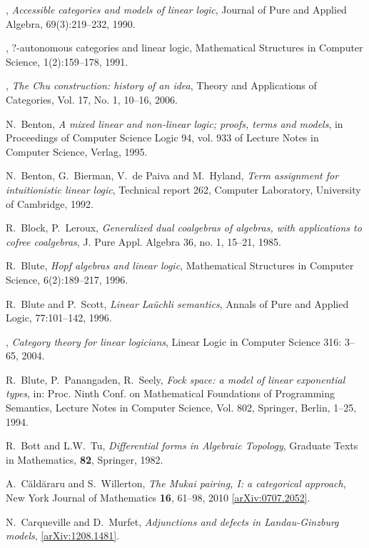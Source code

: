 \documentclass[english,letter paper,12pt,reqno]{article}
\theoremstyle{example}
\numberwithin{equation}{section}
\begin{document}
\begin{thebibliography}{BHLS03}
\bysame, \textsl{Accessible categories and models of linear logic}, Journal of Pure and Applied Algebra, 69(3):219--232, 1990.

\bysame, {$?$-autonomous categories and linear logic}, Mathematical Structures in Computer Science, 1(2):159--178, 1991.

\bysame, \textsl{The {C}hu construction: history of an idea}, Theory and Applications of Categories, Vol. 17, No. 1, 10--16, 2006.

N.~Benton, \textsl{A mixed linear and non-linear logic; proofs, terms and models}, in Proceedings of Computer Science Logic 94, vol. 933 of Lecture Notes in Computer Science, Verlag, 1995.

N.~Benton, G.~Bierman, V.~de Paiva and M.~Hyland, \textsl{Term assignment for intuitionistic linear logic}, Technical report 262, Computer Laboratory, University of Cambridge, 1992.

R.~Block, P.~Leroux, \textsl{Generalized dual coalgebras of algebras, with applications to cofree coalgebras}, J. Pure Appl. Algebra 36, no. 1, 15--21, 1985.

R.~Blute, \textsl{Hopf algebras and linear logic}, Mathematical Structures in Computer Science, 6(2):189--217, 1996.

R.~Blute and P.~Scott, \textsl{Linear {L}a\"{u}chli semantics}, Annals of Pure and Applied Logic, 77:101--142, 1996.

\bysame, \textsl{Category theory for linear logicians}, Linear Logic in Computer Science 316: 3--65, 2004.

R.~Blute, P.~Panangaden, R.~Seely, \textsl{Fock space: a model of linear exponential types}, in: Proc. Ninth Conf. on Mathematical Foundations of Programming Semantics, Lecture Notes in Computer Science, Vol. 802, Springer, Berlin, 1--25, 1994.

R.~Bott and L.W.~Tu, \textsl{Differential forms in {A}lgebraic {T}opology}, Graduate Texts in Mathematics, \textbf{82}, Springer, 1982.

A.~{C\u ald\u araru} and S.~Willerton, \textsl{The Mukai pairing, I: a categorical approach},
New York Journal of Mathematics \textbf{16}, 61--98, 2010
  \href{http://arxiv.org/abs/0707.2052}{[arXiv:0707.2052]}.
  
N.~Carqueville and D.~Murfet, \textsl{Adjunctions and defects in {L}andau-{G}inzburg models}, \href{http://arxiv.org/abs/1208.1481}{[arXiv:1208.1481]}.


\end{thebibliography}
\end{document}
